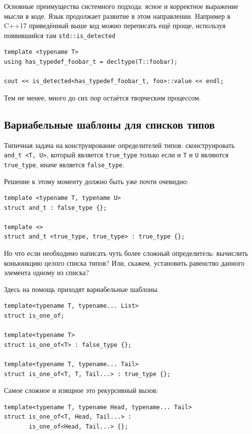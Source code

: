 \documentclass[a4paper,12pt,oneside]{book}
\begin{document}
Основные преимущества системного подхода: ясное и корректное выражение мысли в коде. Язык продолжает развитие в этом направлении. Например в C++17 приведённый выше код можно переписать ещё проще, используя появившийся там \lstinline!std::is_detected!

\begin{lstlisting}
template <typename T> 
using has_typedef_foobar_t = decltype(T::foobar);

cout << is_detected<has_typedef_foobar_t, foo>::value << endl;
\end{lstlisting}

Тем не менее, много до сих пор остаётся творческим процессом.

\subsection{Вариабельные шаблоны для списков типов}

Типичная задача на конструирование определителей типов: сконструировать \lstinline!and_t <T, U>!, который является \lstinline!true_type! только если и \lstinline!T! и \lstinline!U! являются \lstinline!true_type!, иначе является \lstinline!false_type!.

Решение к этому моменту должно быть уже почти очевидно:

\begin{lstlisting}
template <typename T, typename U> 
struct and_t : false_type {};

template <> 
struct and_t <true_type, true_type> : true_type {};
\end{lstlisting}

Но что если необходимо написать чуть более сложный определитель: вычислить коньюнкцию целого списка типов? Или, скажем, установить равенство данного элемента одному из списка?

Здесь на помощь приходят вариабельные шаблоны.

\begin{lstlisting}
template<typename T, typename... List>
struct is_one_of;

template<typename T>
struct is_one_of<T> : false_type {};

template<typename T, typename... Tail>
struct is_one_of<T, T, Tail...> : true_type {};
\end{lstlisting}

Самое сложное и изящное это рекурсивный вызов:

\begin{lstlisting}
template<typename T, typename Head, typename... Tail>
struct is_one_of<T, Head, Tail...> : 
       is_one_of<Head, Tail...> {};
\end{lstlisting}
\end{document}
